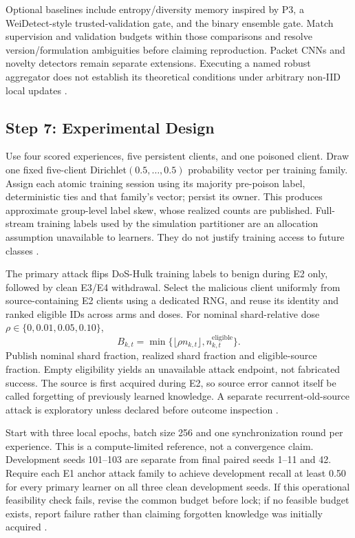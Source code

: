 \documentclass[10pt,a4paper]{article}
\begin{document}
Optional baselines include entropy/diversity memory inspired by P3, a WeiDetect-style trusted-validation gate, and the binary ensemble gate. Match supervision and validation budgets within those comparisons and resolve version/formulation ambiguities before claiming reproduction. Packet CNNs and novelty detectors remain separate extensions. Executing a named robust aggregator does not establish its theoretical conditions under arbitrary non-IID local updates \cite{guo,wei,ensemble,repo}.

\subsection{Step 7: Experimental Design}
Use four scored experiences, five persistent clients, and one poisoned client. Draw one fixed five-client Dirichlet$(0.5,\ldots,0.5)$ probability vector per training family. Assign each atomic training session using its majority pre-poison label, deterministic ties and that family's vector; persist its owner. This produces approximate group-level label skew, whose realized counts are published. Full-stream training labels used by the simulation partitioner are an allocation assumption unavailable to learners. They do not justify training access to future classes \cite{repo,lavaur}.

The primary attack flips DoS-Hulk training labels to benign during E2 only, followed by clean E3/E4 withdrawal. Select the malicious client uniformly from source-containing E2 clients using a dedicated RNG, and reuse its identity and ranked eligible IDs across arms and doses. For nominal shard-relative dose $\rho\in\{0,0.01,0.05,0.10\}$,
\begin{equation}
B_{k,t}=\min\{\lfloor\rho n_{k,t}\rfloor,n_{k,t}^{\mathrm{eligible}}\}.
\end{equation}
Publish nominal shard fraction, realized shard fraction and eligible-source fraction. Empty eligibility yields an unavailable attack endpoint, not fabricated success. The source is first acquired during E2, so source error cannot itself be called forgetting of previously learned knowledge. A separate recurrent-old-source attack is exploratory unless declared before outcome inspection \cite{lavaur,repo}.

Start with three local epochs, batch size 256 and one synchronization round per experience. This is a compute-limited reference, not a convergence claim. Development seeds 101--103 are separate from final paired seeds 1--11 and 42. Require each E1 anchor attack family to achieve development recall at least 0.50 for every primary learner on all three clean development seeds. If this operational feasibility check fails, revise the common budget before lock; if no feasible budget exists, report failure rather than claiming forgotten knowledge was initially acquired \cite{repo}.
\end{document}
